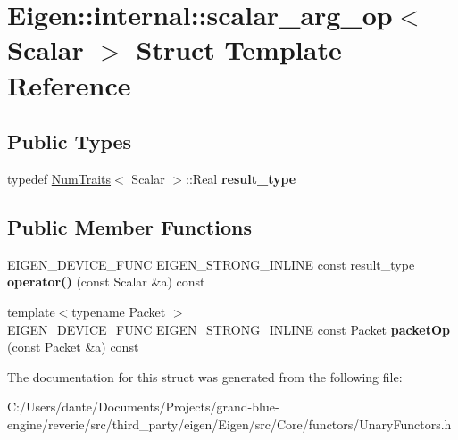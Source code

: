 \hypertarget{struct_eigen_1_1internal_1_1scalar__arg__op}{}\section{Eigen\+::internal\+::scalar\+\_\+arg\+\_\+op$<$ Scalar $>$ Struct Template Reference}
\label{struct_eigen_1_1internal_1_1scalar__arg__op}
\subsection*{Public Types}
\begin{DoxyCompactItemize}
\item 
\mbox{\label{struct_eigen_1_1internal_1_1scalar__arg__op_ad7c11d9f7198929bc3552f164dafda2b}} 
typedef \mbox{\hyperlink{struct_eigen_1_1_num_traits}{Num\+Traits}}$<$ Scalar $>$\+::Real {\bfseries result\+\_\+type}
\end{DoxyCompactItemize}
\subsection*{Public Member Functions}
\begin{DoxyCompactItemize}
\item 
\mbox{\label{struct_eigen_1_1internal_1_1scalar__arg__op_ae469b50e2c22f750e702832636f391c7}} 
E\+I\+G\+E\+N\+\_\+\+D\+E\+V\+I\+C\+E\+\_\+\+F\+U\+NC E\+I\+G\+E\+N\+\_\+\+S\+T\+R\+O\+N\+G\+\_\+\+I\+N\+L\+I\+NE const result\+\_\+type {\bfseries operator()} (const Scalar \&a) const
\item 
\mbox{\label{struct_eigen_1_1internal_1_1scalar__arg__op_a45c9306e3c96d90a66afed69e0a8247c}} 
{\footnotesize template$<$typename Packet $>$ }\\E\+I\+G\+E\+N\+\_\+\+D\+E\+V\+I\+C\+E\+\_\+\+F\+U\+NC E\+I\+G\+E\+N\+\_\+\+S\+T\+R\+O\+N\+G\+\_\+\+I\+N\+L\+I\+NE const \mbox{\hyperlink{union_eigen_1_1internal_1_1_packet}{Packet}} {\bfseries packet\+Op} (const \mbox{\hyperlink{union_eigen_1_1internal_1_1_packet}{Packet}} \&a) const
\end{DoxyCompactItemize}


The documentation for this struct was generated from the following file\+:\begin{DoxyCompactItemize}
\item 
C\+:/\+Users/dante/\+Documents/\+Projects/grand-\/blue-\/engine/reverie/src/third\+\_\+party/eigen/\+Eigen/src/\+Core/functors/Unary\+Functors.\+h\end{DoxyCompactItemize}
